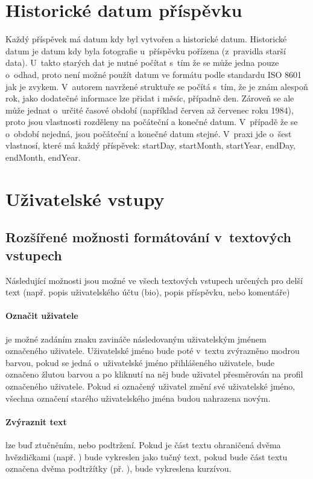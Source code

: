 \documentclass[12pt, a4paper,
  oneside,      %
]{report}
\begin{document}
\section{Historické datum příspěvku}\label{section:historical_date}
Každý příspěvek má datum kdy byl vytvořen a historické datum. Historické datum je datum kdy byla fotografie u~příspěvku pořízena (z~pravidla starší data). U~takto starých dat je nutné počítat s~tím že se může jedna pouze o~odhad, proto není možné použít datum ve formátu podle standardu ISO 8601 jak je zvykem. V~autorem navržené struktuře se počítá s~tím, že je znám alespoň rok, jako dodatečné informace lze přidat i měsíc, případně den. Zároveň se ale může jednat o~určité časové období (například červen až červenec roku 1984), proto jsou vlastnosti rozděleny na počáteční a konečné datum. V~případě že se o~období nejedná, jsou počáteční a konečné datum stejné. V~praxi jde o~šest vlastnosí, které má každý příspěvek: startDay, startMonth, startYear, endDay, endMonth, endYear.

\section{Uživatelské vstupy}
\subsection{Rozšířené možnosti formátování v~textových vstupech}
Následující možnosti jsou možné ve všech textových vstupech určených pro delší text (např. popis uživatelského účtu (bio), popis příspěvku, nebo komentáře)
\paragraph{Označit uživatele} je možné zadáním znaku zavináče následovaným uživatelským jménem označeného uživatele. Uživatelské jméno bude poté v~textu zvýrazněno modrou barvou, pokud se jedná o~uživatelské jméno přihlášeného uživatele, bude označeno žlutou barvou a po kliknutí na něj bude uživatel přesměrován na profil označeného uživatele. Pokud si označený uživatel změní své uživatelské jméno, všechna označení starého uživatelského jména budou nahrazena novým.
\paragraph{Zvýraznit text} lze buď ztučněním, nebo podtržení. Pokud je část textu ohraničená dvěma hvězdičkami (např. ) bude vykreslen jako tučný text, pokud bude část textu označena dvěma podtržítky (př. ), bude vykreslena kurzívou.
\end{document}
